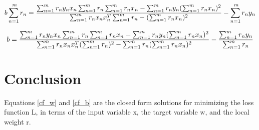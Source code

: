 \documentclass[a4paper]{article}
\begin{document}
$$b \sum_{n=1}^{\\m} r_n = \frac{\sum_{n=1}^{\\m} r_n y_n x_n \sum_{n=1}^{\\m} r_n \sum_{n=1}^{\\m}r_n x_n - \sum_{n=1}^{\\m} r_n y_n (\sum_{n=1}^{\\m} r_n x_n)^2}{\sum_{n=1}^{\\m}r_n x_n x_n^T \sum_{n=1}^{\\m} r_n - ({\sum_{n=1}^{\\m}r_n x_n})^2} - \sum_{n=1}^{\\m} r_n y_n$$

\begin{equation}
\label{cf_b}
b = \frac{\sum_{n=1}^{\\m} r_n y_n x_n \sum_{n=1}^{\\m} r_n \sum_{n=1}^{\\m}r_n x_n - \sum_{n=1}^{\\m} r_n y_n (\sum_{n=1}^{\\m} r_n x_n)^2}{\sum_{n=1}^{\\m}r_n x_n x_n^T (\sum_{n=1}^{\\m} r_n)^2 - \sum_{n=1}^{\\m} r_n ({\sum_{n=1}^{\\m}r_n x_n})^2} - \frac{\sum_{n=1}^{\\m} r_n y_n}{\sum_{n=1}^{\\m} r_n}
\end{equation}

\vspace{5mm}

\section{Conclusion}
Equations \ref{cf_w} and \ref{cf_b} are the closed form solutions for minimizing the loss function L, in terms of the input variable x, the target variable w, and the local weight r.
\end{document}
